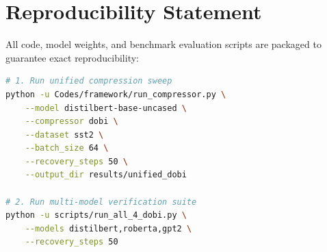 \section{Reproducibility Statement}
All code, model weights, and benchmark evaluation scripts are packaged to guarantee exact reproducibility:
\begin{lstlisting}[language=bash]
# 1. Run unified compression sweep
python -u Codes/framework/run_compressor.py \
    --model distilbert-base-uncased \
    --compressor dobi \
    --dataset sst2 \
    --batch_size 64 \
    --recovery_steps 50 \
    --output_dir results/unified_dobi

# 2. Run multi-model verification suite
python -u scripts/run_all_4_dobi.py \
    --models distilbert,roberta,gpt2 \
    --recovery_steps 50
\end{lstlisting}
